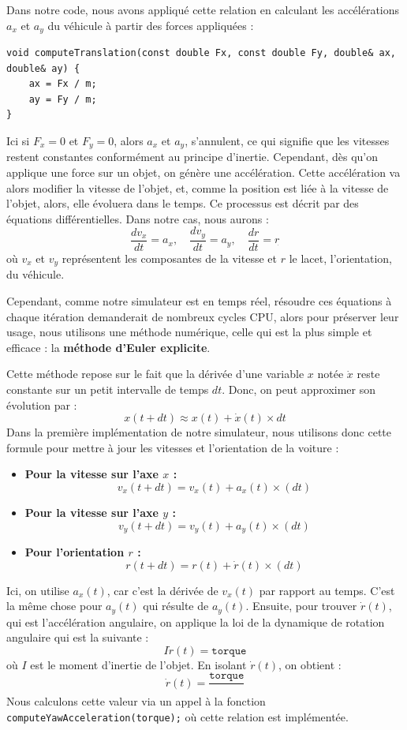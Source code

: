Dans notre code, nous avons appliqué cette relation en calculant les accélérations $a_x$ et $a_y$ du véhicule à partir des forces appliquées :


\begin{lstlisting}[style=CStyle,label={lst:void_computeTranslation}]
void computeTranslation(const double Fx, const double Fy, double& ax, double& ay) {
    ax = Fx / m;
    ay = Fy / m;
}
\end{lstlisting}

Ici si $F_x = 0$ et $F_y = 0$, alors $a_x$ et $a_y$, s'annulent, ce qui signifie que les vitesses restent constantes conformément au principe d'inertie.
Cependant, dès qu'on applique une force sur un objet, on génère une accélération. Cette accélération va alors modifier la vitesse de l'objet, et, comme la position est liée à la vitesse de l'objet, alors, elle évoluera dans le temps. Ce processus est décrit par des équations différentielles. Dans notre cas, nous aurons :
$$\frac{d v_x}{dt} = a_x, \quad \frac{d v_y}{dt} = a_y, \quad \frac{d r}{dt} = r_{\dot{}}$$
où $v_x$ et $v_y$ représentent les composantes de la vitesse et $r$ le lacet, l'orientation, du véhicule.

Cependant, comme notre simulateur est en temps réel, résoudre ces équations à chaque itération demanderait de nombreux cycles CPU, alors pour préserver leur usage, nous utilisons une méthode numérique, celle qui est la plus simple et efficace : la \textbf{méthode d'Euler explicite}.

Cette méthode repose sur le fait que la dérivée d'une variable $x$ notée $\dot{x}$ reste constante sur un petit intervalle de temps $dt$. Donc, on peut approximer son évolution par :
$$x(t+dt) \approx x(t) + \dot{x}(t) \times dt$$
Dans la première implémentation de notre simulateur, nous utilisons donc cette formule pour mettre à jour les vitesses et l'orientation de la voiture :
\\
\begin{itemize}
    \item \textbf{Pour la vitesse sur l'axe $x$ :}
    $$v_x(t+dt) = v_x(t)+a_x(t)\times(dt)$$
    \item \textbf{Pour la vitesse sur l'axe $y$ :}
    $$v_y(t+dt) = v_y(t)+a_y(t)\times(dt)$$
    \item \textbf{Pour l'orientation $r$ :}
    $$r(t+dt) = r(t)+\dot{r}(t)\times(dt)$$
\end{itemize}
Ici, on utilise $a_x(t)$, car c'est la dérivée de $v_x(t)$ par rapport au temps. C'est la même chose pour $a_y(t)$ qui résulte de $a_y(t)$. Ensuite, pour trouver $\dot{r}(t)$, qui est l'accélération angulaire, on applique la loi de la dynamique de rotation angulaire qui est la suivante :
$$I\dot{r}(t) = \texttt{torque}$$
où $I$ est le moment d'inertie de l'objet. En isolant $\dot{r}(t)$, on obtient :
$$\dot{r}(t)= {\frac{\texttt{torque}}{}}$$
Nous calculons cette valeur via un appel à la fonction \texttt{computeYawAcceleration(torque);} où cette relation est implémentée.

